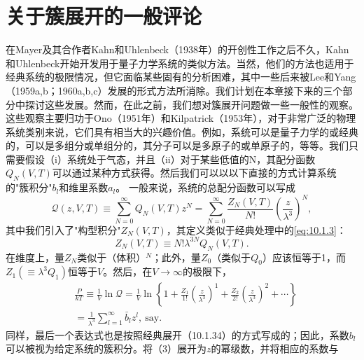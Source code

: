 \section{关于簇展开的一般评论}\label{ux5173ux4e8eux7c07ux5c55ux5f00ux7684ux4e00ux822cux8bc4ux8bba}
在Mayer及其合作者Kahn和Uhlenbeck（1938年）的开创性工作之后不久，Kahn和Uhlenbeck开始开发用于量子力学系统的类似方法。当然，他们的方法也适用于经典系统的极限情况，但它面临某些固有的分析困难，其中一些后来被Lee和Yang（1959a,b；1960a,b,c）发展的形式方法所消除。我们计划在本章接下来的三个部分中探讨这些发展。然而，在此之前，我们想对簇展开问题做一些一般性的观察。这些观察主要归功于Ono（1951年）和Kilpatrick（1953年），对于非常广泛的物理系统类别来说，它们具有相当大的兴趣价值。例如，系统可以是量子力学的或经典的，可以是多组分或单组分的，其分子可以是多原子的或单原子的，等等。我们只需要假设（i）系统处于气态，并且（ii）对于某些低值的N，其配分函数\(Q_{N}(V,T)\)可以通过某种方式获得。然后我们可以以以下直接的方式计算系统的"簇积分"\(b_{l}\)和维里系数\(a_{l}\)。
一般来说，系统的总配分函数可以写成
\begin{equation}\tag{10.4.1}\label{eq:10.4.1}
\mathcal { Q } ( z , V , T ) \equiv \sum _ { N = 0 } ^{\infty} Q _ { N } ( V , T ) z ^{N} = \sum _ { N = 0 } ^{\infty} \frac { Z _ { N } ( V , T ) } { N ! } \left( \frac { z } { \lambda ^{3} } \right) ^{N} ,
\end{equation}
其中我们引入了"构型积分"\(Z_{N}(V,T)\)，其定义类似于经典处理中的\autoref{eq:10.1.3}：
\begin{equation}\tag{10.4.2}\label{eq:10.4.2}
Z _ { N } ( V , T ) \equiv N ! \lambda ^{3 N} Q _ { N } ( V , T ) .
\end{equation}
在维度上，量\(Z_{N}\)类似于（体积）\(^{N}\)；此外，量\(Z_{0}\)（类似于\(Q_{0}\)）应该恒等于1，而\(Z_{1}(\equiv\lambda^{3}Q_{1})\)恒等于\(V\)。然后，在\(V\to\infty\)的极限下，
\begin{equation}\tag{10.4.3}\label{eq:10.4.3}
\begin{array}{rl} & { \frac { P } { k T } \equiv \frac { 1 } { V } \ln \mathcal { Q } = \frac { 1 } { V } \ln \left\{ 1 + \frac { Z _ { 1 } } { 1 ! } \left( \frac { z } { \lambda ^{3} } \right) ^{1} + \frac { Z _ { 2 } } { 2 ! } \left( \frac { z } { \lambda ^{3} } \right) ^{2} + \cdots \right\} } \\& { = \frac { 1 } { \lambda ^{3} } \sum _ { l = 1 } ^{\infty} \bar { b } _ { l } z ^{l} , \mathrm { ~ s a y } . } \end{array}
\end{equation}
同样，最后一个表达式也是按照经典展开（10.1.34）的方式写成的；因此，系数\(b_{l}\)可以被视为给定系统的簇积分。将（3）展开为\(z\)的幂级数，并将相应的系数与
